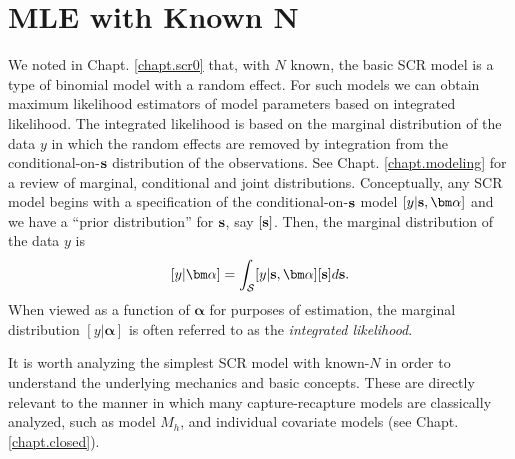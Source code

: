 \section{MLE with Known N}

We noted in Chapt. \ref{chapt.scr0} that, with $N$ known, the basic SCR model is a
type of binomial model with a random effect. For such models we
can  obtain maximum likelihood estimators of model parameters
based on integrated likelihood. The integrated likelihood is based on
the marginal distribution of the data $y$ in which the random effects
are removed by integration from the conditional-on-${\bf s}$ distribution of the
observations. See Chapt. \ref{chapt.modeling} for a
review of marginal, conditional and joint distributions.
Conceptually, any SCR model begins with a specification
of the conditional-on-${\bf s}$ model $[y|{\bf s},{\bm \alpha}]$ and we have
a ``prior distribution'' for ${\bf s}$, say $[{\bf s}]$. Then, the
marginal distribution of the data $y$ is
\[
[y|{\bm \alpha}] =  \int_{\cal S} [y|{\bf s},{\bm \alpha}][{\bf s}] d{\bf s}.
\]
When viewed as a function of ${\bm \alpha}$ for purposes of estimation, the
marginal distribution $[y|{\bm \alpha}]$ is often referred to as the {\it
  integrated likelihood}.

It is worth analyzing 
the simplest SCR model with known-$N$ in order to understand the
underlying mechanics and basic concepts. These are directly relevant to
the manner in which many capture-recapture models are classically
analyzed, such as model $M_h$, and individual covariate models (see
Chapt. \ref{chapt.closed}).

